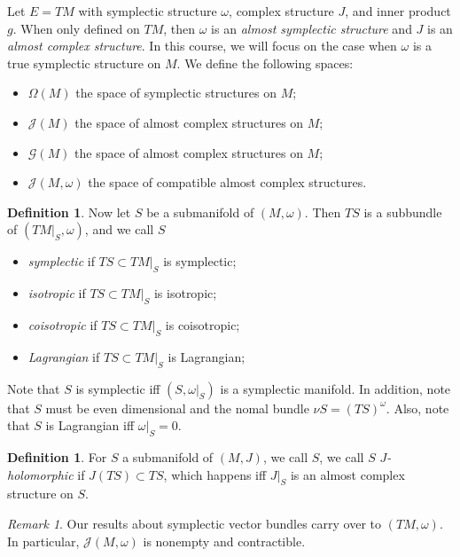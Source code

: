 \documentclass[leqno, openany]{memoir}
\theoremstyle{definition}
\newtheorem{defn}[thm]{Definition}
\theoremstyle{remark}
\newtheorem{rmk}[thm]{Remark}
\theoremstyle{plain}
\theoremstyle{definition}
\theoremstyle{remark}
\newcommand{\mc}[1]{\mathcal{#1}}
\begin{document}
Let $E = TM$ with symplectic structure $\omega$, complex structure $J$, and
inner product $g$. When only defined on $TM$, then $\omega$ is an
\textit{almost symplectic structure} and $J$ is an \textit{almost complex
structure}. In this course, we will focus on the case when $\omega$ is a true
symplectic structure on $M$. We define the following spaces: \begin{itemize}
    \item $\Omega(M)$ the space of symplectic structures on $M$; \item
        $\mc{J}(M)$ the space of almost complex structures on $M$; \item
        $\mc{G}(M)$ the space of almost complex structures on $M$; \item
$\mc{J}(M, \omega)$ the space of compatible almost complex structures.
\end{itemize}

\begin{defn} Now let $S$ be a submanifold of $(M, \omega)$. Then $TS$ is a
    subbundle of $(TM|_S, \omega)$, and we call $S$ \begin{itemize} \item
        \textit{symplectic} if $TS \subset TM|_S$ is symplectic; \item
        \textit{isotropic} if $TS \subset TM|_S$ is isotropic; \item
\textit{coisotropic} if $TS \subset TM|_S$ is coisotropic; \item
\textit{Lagrangian} if $TS \subset TM|_S$ is Lagrangian; \end{itemize}
\end{defn}

Note that $S$ is symplectic iff $(S, \omega|_S)$ is a symplectic manifold. In
addition, note that $S$ must be even dimensional and the nomal bundle $\nu S =
(TS)^{\omega}$. Also, note that $S$ is Lagrangian iff $\omega|_S = 0$.

\begin{defn} For $S$ a submanifold of $(M, J)$, we call $S$, we call $S$
\textit{$J$-holomorphic} if $J(TS) \subset TS$, which happens iff $J|_S$ is an
almost complex structure on $S$.  \end{defn}

\begin{rmk} Our results about symplectic vector bundles carry over to $(TM,
\omega)$. In particular, $\mc{J}(M, \omega)$ is nonempty and contractible.
\end{rmk}
\end{document}
